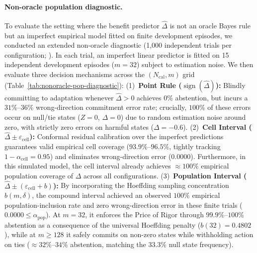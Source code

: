\paragraph{Non-oracle population diagnostic.}
To evaluate the setting where the benefit predictor $\widehat\Delta$ is not an oracle Bayes rule but an imperfect empirical model fitted on finite development episodes, we conducted an extended non-oracle diagnostic (1{,}000 independent trials per configuration; ).
In each trial, an imperfect linear predictor is fitted on 15 independent development episodes ($m=32$) subject to estimation noise. We then evaluate three decision mechanisms across the $(N_{\mathrm{cal}}, m)$ grid (Table~\ref{tab:nonoracle-pop-diagnostic}):
(1)~\textbf{Point Rule ($\operatorname{sign}(\widehat\Delta)$):} Blindly committing to adaptation whenever $\widehat\Delta > 0$ achieves $0\%$ abstention, but incurs a $31\%$--$36\%$ wrong-direction commitment error rate; crucially, $100\%$ of these errors occur on null/tie states ($Z=0$, $\Delta=0$) due to random estimation noise around zero, with strictly zero errors on harmful states ($\Delta = -0.6$).
(2)~\textbf{Cell Interval ($\widehat\Delta \pm \varepsilon_{\mathrm{cell}}$):} Conformal residual calibration over the imperfect predictions guarantees valid empirical cell coverage ($93.9\%$--$96.5\%$, tightly tracking $1-\alpha_{\mathrm{cell}} = 0.95$) and eliminates wrong-direction error ($0.0000$). Furthermore, in this simulated model, the cell interval already achieves $\approx 100\%$ empirical population coverage of $\Delta$ across all configurations.
(3)~\textbf{Population Interval ($\widehat\Delta \pm (\varepsilon_{\mathrm{cell}} + b)$):} By incorporating the Hoeffding sampling concentration $b(m, \delta)$, the compound interval achieved an observed $100\%$ empirical population-inclusion rate and zero wrong-direction error in these finite trials ($0.0000 \le \alpha_{\mathrm{pop}}$). At $m=32$, it enforces the Price of Rigor through $99.9\%$--$100\%$ abstention as a consequence of the universal Hoeffding penalty ($b(32) = 0.4802$), while at $m \ge 128$ it safely commits on non-zero states while withholding action on ties ($\approx 32\%$--$34\%$ abstention, matching the $33.3\%$ null state frequency).


